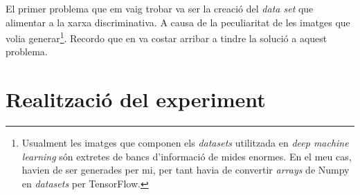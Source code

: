 El primer problema que em vaig trobar va ser la creació del \textit{data set} que alimentar a la xarxa discriminativa. A causa de la peculiaritat de les imatges que volia generar\footnote{Usualment les imatges que componen els \textit{datasets} utilitzada en \textit{deep machine learning} són extretes de bancs d'informació de mides enormes. En el meu cas, havien de ser generades per mi, per tant havia de convertir \textit{arrays} de Numpy en \textit{datasets} per TensorFlow.}. Recordo que en va costar arribar a tindre la solució a aquest problema. 


\chapter{Realització del experiment} 
 